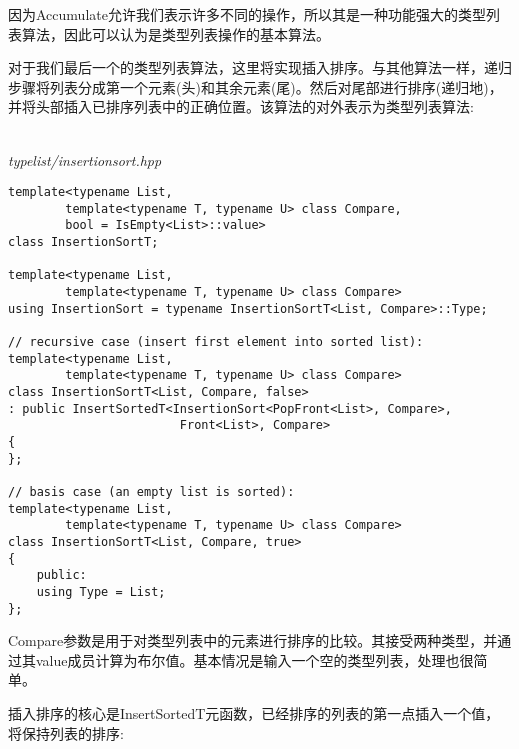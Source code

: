 因为Accumulate允许我们表示许多不同的操作，所以其是一种功能强大的类型列表算法，因此可以认为是类型列表操作的基本算法。


对于我们最后一个的类型列表算法，这里将实现插入排序。与其他算法一样，递归步骤将列表分成第一个元素(头)和其余元素(尾)。然后对尾部进行排序(递归地)，并将头部插入已排序列表中的正确位置。该算法的对外表示为类型列表算法:

\hspace*{\fill} \\ %
\noindent
\textit{typelist/insertionsort.hpp}
\begin{lstlisting}[style=styleCXX]
template<typename List,
		template<typename T, typename U> class Compare,
		bool = IsEmpty<List>::value>
class InsertionSortT;

template<typename List,
		template<typename T, typename U> class Compare>
using InsertionSort = typename InsertionSortT<List, Compare>::Type;

// recursive case (insert first element into sorted list):
template<typename List,
		template<typename T, typename U> class Compare>
class InsertionSortT<List, Compare, false>
: public InsertSortedT<InsertionSort<PopFront<List>, Compare>,
						Front<List>, Compare>
{
};

// basis case (an empty list is sorted):
template<typename List,
		template<typename T, typename U> class Compare>
class InsertionSortT<List, Compare, true>
{
	public:
	using Type = List;
};
\end{lstlisting}

Compare参数是用于对类型列表中的元素进行排序的比较。其接受两种类型，并通过其value成员计算为布尔值。基本情况是输入一个空的类型列表，处理也很简单。

插入排序的核心是InsertSortedT元函数，已经排序的列表的第一点插入一个值，将保持列表的排序:

